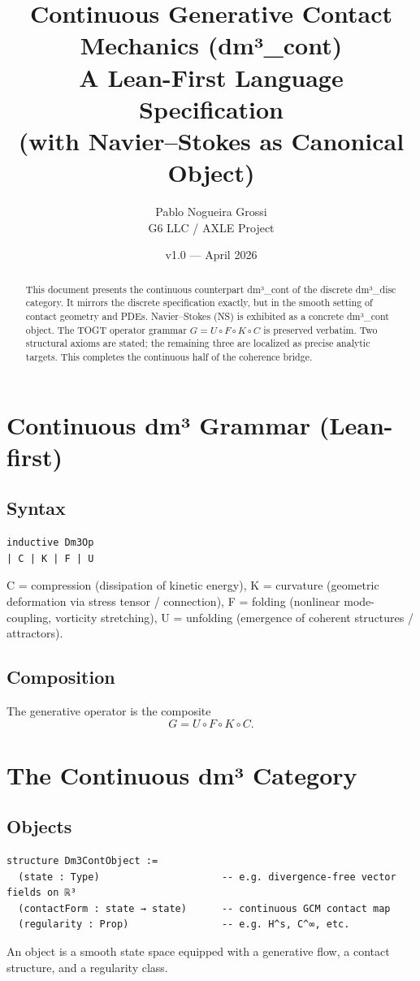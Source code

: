 \documentclass[11pt,a4paper]{article}
\title{\textbf{Continuous Generative Contact Mechanics (dm³\_cont)}\\
A Lean-First Language Specification \\
(with Navier--Stokes as Canonical Object)}
\author{Pablo Nogueira Grossi \\ G6 LLC / AXLE Project}
\date{v1.0 — April 2026}
\begin{document}
\maketitle

\begin{abstract}
This document presents the continuous counterpart dm³\_cont of the discrete dm³\_disc category. It mirrors the discrete specification exactly, but in the smooth setting of contact geometry and PDEs. Navier--Stokes (NS) is exhibited as a concrete dm³\_cont object. The TOGT operator grammar \(G = U \circ F \circ K \circ C\) is preserved verbatim. Two structural axioms are stated; the remaining three are localized as precise analytic targets. This completes the continuous half of the coherence bridge.
\end{abstract}

\section{Continuous dm³ Grammar (Lean-first)}

\subsection{Syntax}
\begin{lstlisting}
inductive Dm3Op
| C | K | F | U
\end{lstlisting}
C = compression (dissipation of kinetic energy),  
K = curvature (geometric deformation via stress tensor / connection),  
F = folding (nonlinear mode-coupling, vorticity stretching),  
U = unfolding (emergence of coherent structures / attractors).

\subsection{Composition}
The generative operator is the composite
\[
G = U \circ F \circ K \circ C.
\]

\section{The Continuous dm³ Category}

\subsection{Objects}
\begin{lstlisting}
structure Dm3ContObject :=
  (state : Type)                     -- e.g. divergence-free vector fields on ℝ³
  (contactForm : state → state)      -- continuous GCM contact map
  (regularity : Prop)                -- e.g. H^s, C^∞, etc.
\end{lstlisting}
An object is a smooth state space equipped with a generative flow, a contact structure, and a regularity class.
\end{document}
